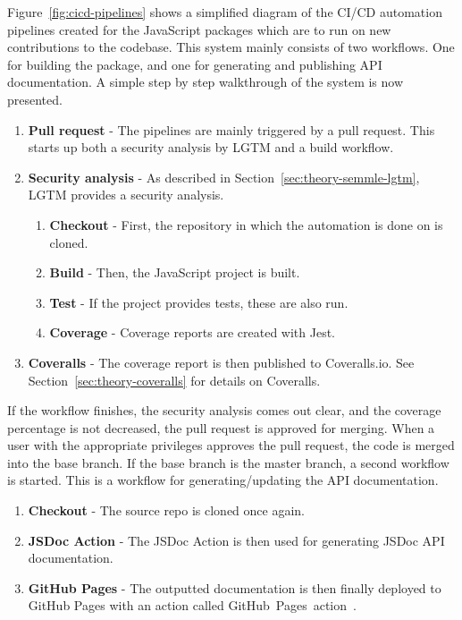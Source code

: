 Figure~\ref{fig:cicd-pipelines} shows a simplified diagram of the CI/CD automation pipelines created for the JavaScript packages which are to run on new contributions to the codebase. This system mainly consists of two workflows. One for building the package, and one for generating and publishing API documentation. A simple step by step walkthrough of the system is now presented.

\begin{enumerate}
    \item \textbf{Pull request} - The pipelines are mainly triggered by a pull request. This starts up both a security analysis by LGTM and a build workflow.
    \item \textbf{Security analysis} - As described in Section~\ref{sec:theory-semmle-lgtm}, LGTM provides a security analysis.
    \begin{enumerate}
        \item \textbf{Checkout} - First, the repository in which the automation is done on is cloned.
        \item \textbf{Build} - Then, the JavaScript project is built.
        \item \textbf{Test} - If the project provides tests, these are also run.
        \item \textbf{Coverage} - Coverage reports are created with Jest.
    \end{enumerate}
    \item \textbf{Coveralls} - The coverage report is then published to Coveralls.io. See Section~\ref{sec:theory-coveralls} for details on Coveralls.
\end{enumerate}

If the workflow finishes, the security analysis comes out clear, and the coverage percentage is not decreased, the pull request is approved for merging. When a user with the appropriate privileges approves the pull request, the code is merged into the base branch. If the base branch is the master branch, a second workflow is started. This is a workflow for generating/updating the API documentation.

\begin{enumerate}
    \item \textbf{Checkout} - The source repo is cloned once again.
    \item \textbf{JSDoc Action} - The JSDoc Action is then used for generating JSDoc API documentation.
    \item \textbf{GitHub Pages} - The outputted documentation is then finally deployed to GitHub Pages with an action called GitHub~Pages~action~\cite{github-pages-action}.
\end{enumerate}

